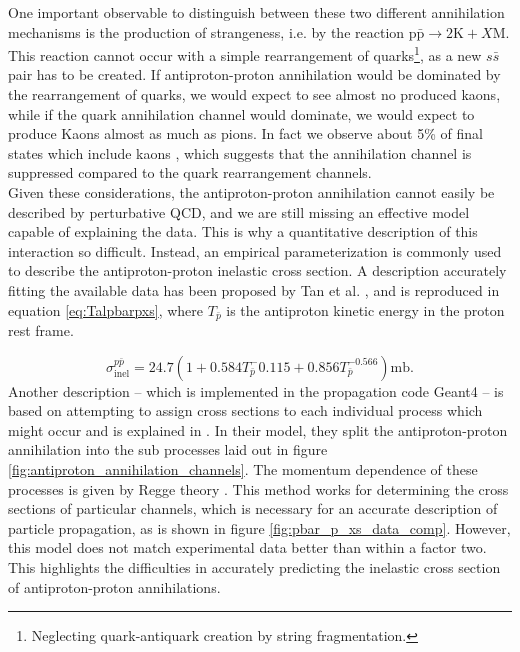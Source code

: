 One important observable to distinguish between these two different annihilation mechanisms is the production of strangeness, i.e. by the reaction $\mathrm{p\bar{p}} \rightarrow 2\mathrm{K}+ X\mathrm{M}$. This reaction cannot occur with a simple rearrangement of quarks\footnote{Neglecting quark-antiquark creation by string fragmentation.}, as a new $s\bar{s}$ pair has to be created. If antiproton-proton annihilation would be dominated by the rearrangement of quarks, we would expect to see almost no produced kaons, while if the quark annihilation channel would dominate, we would expect to produce Kaons almost as much as pions. In fact we observe about 5\% of final states which include kaons \cite{antiproton_cross_sections_review, hidden_Strangeness}, which suggests that the annihilation channel is suppressed compared to the quark rearrangement channels. \\

Given these considerations, the antiproton-proton annihilation cannot easily be described by perturbative QCD, and we are still missing an effective model capable of explaining the data. This is why a quantitative description of this interaction so difficult. Instead, an empirical parameterization is commonly used to describe the antiproton-proton inelastic cross section. A description accurately fitting the available data has been proposed by Tan et al. \cite{Tan_1983}, and is reproduced in equation \ref{eq:Talpbarpxs}, where $T_{\bar{p}}$ is the antiproton kinetic energy in the proton rest frame. 
%

\begin{equation}\label{eq:Talpbarpxs}
    \sigma_\mathrm{inel}^{p\bar{p}} = 24.7 (1 + 0.584T_{\bar{p}}^-0.115 + 0.856 T_{\bar{p}}^{-0.566}) \mathrm{mb} .
\end{equation}
Another description -- which is implemented in the propagation code Geant4 -- is based on attempting to assign cross sections to each individual process which might occur and is explained in \cite{antiproton_dynamics_CERN}. In their model, they split the antiproton-proton annihilation into the sub processes laid out in figure \ref{fig:antiproton_annihilation_channels}. The momentum dependence of these processes is given by Regge theory \cite{antiproton_dynamics_2, antiproton_dynamics_CERN, Regge1959}. This method works for determining the cross sections of particular channels, which is necessary for an accurate description of particle propagation, as is shown in figure \ref{fig:pbar_p_xs_data_comp}. However, this model does not match experimental data better than within a factor two. This highlights the difficulties in accurately predicting the inelastic cross section of antiproton-proton annihilations.

